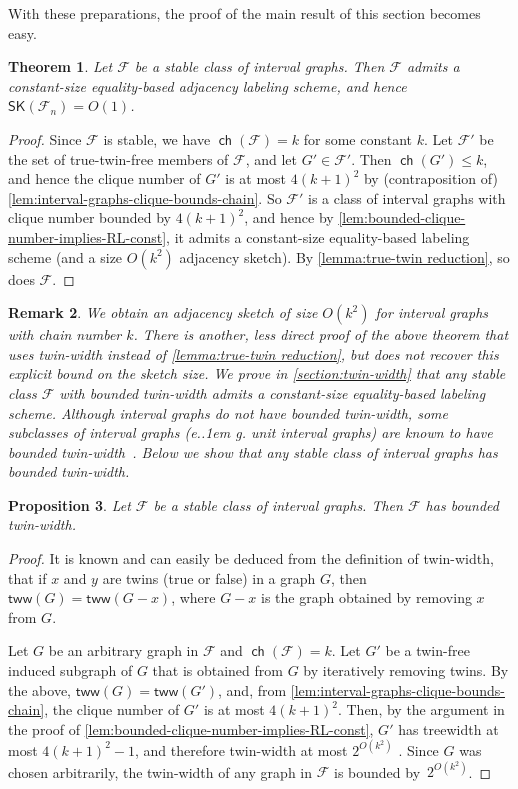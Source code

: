 \documentclass{article}
\makeatletter
\newtheorem{theorem}{Theorem}\newtheorem{lemma}[theorem]{Lemma}\newtheorem{proposition}[theorem]{Proposition}\newtheorem{corollary}[theorem]{Corollary}\newtheorem{definition}[theorem]{Definition}\newtheorem{claim}[theorem]{Claim}\newtheorem{remark}[theorem]{Remark}\newtheorem{observation}[theorem]{Observation}\newtheorem{conjecture}[theorem]{Conjecture}\newtheorem{example}[theorem]{Example}
\newcommand{\cF}{\ensuremath{\mathcal{F}}}
\newcommand{\tw}{\mathsf{tww}}
\newcommand*\eg{e.\kern.1em g.\@\xspace} %
\newcommand{\RL}{\mathsf{SK}}
\DeclareMathOperator\ch{\mathsf{ch}}
\makeatother
\begin{document}
With these preparations, the proof of the main result of this section becomes easy.


\begin{theorem}
\label{thm:interval graphs}
Let $\cF$  be a stable class of interval graphs.
Then $\cF$ admits a constant-size equality-based adjacency labeling scheme, and hence $\RL(\cF_n) = O(1)$.
\end{theorem}

\begin{proof}
Since $\cF$ is stable, we have $\ch(\cF) = k$ for some constant $k$. Let $\cF'$ be the set of
true-twin-free members of $\cF$, and let $G' \in \cF'$. Then $\ch(G')\leq k$, and hence the clique
number of $G'$ is at most $4(k+1)^2$ by (contraposition of)
\cref{lem:interval-graphs-clique-bounds-chain}. So $\cF'$ is a class of interval graphs with clique
number bounded by $4(k+1)^2$, and hence by \cref{lem:bounded-clique-number-implies-RL-const}, it
admits a constant-size equality-based labeling scheme (and a size $O(k^2)$ adjacency sketch). By
\cref{lemma:true-twin reduction}, so does $\cF$.
\end{proof}

\begin{remark}
We obtain an adjacency sketch of size $O(k^2)$ for interval graphs with chain number $k$.  There is
another, less direct proof of the above theorem that uses \emph{twin-width} instead of
\cref{lemma:true-twin reduction}, but does not recover this explicit bound on the sketch size. We
prove in \cref{section:twin-width} that any stable class $\cF$ with bounded twin-width admits a
constant-size equality-based labeling scheme. Although interval graphs do not have bounded
twin-width, some subclasses of interval graphs (\eg unit interval graphs) are known to have
bounded twin-width~\cite{BKTW20}. Below we show that any stable class of interval graphs has bounded
twin-width. 
\end{remark}

\begin{proposition}
\label{prop:stable interval twin-width}
Let $\cF$ be a stable class of interval graphs. Then $\cF$ has bounded twin-width.
\end{proposition}
\begin{proof}
It is known and can easily be deduced from the definition of twin-width, that if $x$ and $y$ are twins (true or false) in a graph $G$, then $\tw(G) = \tw(G-x)$, where $G-x$ is the graph obtained by removing $x$ from $G$.

Let $G$ be an arbitrary graph in $\cF$ and $\ch(\cF) = k$. Let $G'$ be a twin-free induced subgraph of $G$ that is obtained from $G$ by iteratively removing twins. By the above, $\tw(G) = \tw(G')$, and, from \cref{lem:interval-graphs-clique-bounds-chain}, the clique number of $G'$ is at most $4(k+1)^2$. 
Then, by the argument in the proof of
\cref{lem:bounded-clique-number-implies-RL-const}, $G'$ has treewidth at most $4(k+1)^2-1$, and therefore twin-width at most $2^{O(k^2)}$ \cite{BD23}. Since $G$ was chosen arbitrarily, the twin-width of any graph in $\cF$ is bounded by~$2^{O(k^2)}$.
\end{proof}
\end{document}
